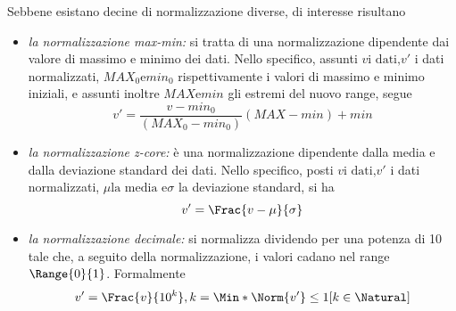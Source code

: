 \documentclass{subfiles}
\begin{document}
Sebbene esistano decine di normalizzazione diverse, di interesse risultano
\begin{itemize}
    \item \emph{la normalizzazione max-min:} si tratta di una normalizzazione dipendente dai valore di massimo e minimo dei dati.
          Nello specifico, assunti \(v \text{i dati,} v' \) i dati normalizzati, \(MAX_{0} \text{e} min_{0}\) rispettivamente i valori di massimo e minimo iniziali,
          e assunti inoltre \(MAX \text{e} min\) gli estremi del nuovo range, segue
          \[
              v' = \frac{v - min_{0}}{(MAX_{0} - min_{0})}(MAX - min) + min
          \]
    \item \emph{la normalizzazione z-core:} è una normalizzazione dipendente dalla media e dalla deviazione standard dei dati.
          Nello specifico, posti \(v \text{i dati,} v'\) i dati normalizzati, \(\mu \text{la media e} \sigma\) la deviazione standard, si ha
          \[
              v' = \Frac{v - \mu}{\sigma}
          \]
    \item \emph{la normalizzazione decimale:} si normalizza dividendo per una potenza di 10 tale che,
          a seguito della normalizzazione, i valori cadano nel range \(\Range{0}{1}\).
          Formalmente
          \[
              v' = \Frac{v}{10^{k}}, k = \Min*{\Norm{v'} \le 1}[k \in \Natural]
          \]
\end{itemize}
\end{document}
